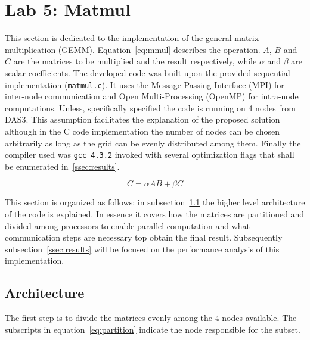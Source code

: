 \section{Lab 5: Matmul}

This section is dedicated to the implementation of the general matrix multiplication (GEMM). Equation~\ref{eq:mmul} describes the operation.
$A$, $B$ and $C$ are the matrices to be multiplied and the result respectively, while $\alpha$ and $\beta$ are scalar coefficients. 
The developed code was built upon the provided sequential implementation (\texttt{matmul.c}).
It uses the Message Passing Interface (MPI) for inter-node communication and Open Multi-Processing (OpenMP) for intra-node computations.
Unless, specifically specified the code is running on 4 nodes from DAS3. This assumption facilitates the explanation of the proposed solution although in the C code implementation the number of nodes can be chosen arbitrarily as long as the grid can be evenly distributed among them.
Finally the compiler used was \texttt{gcc 4.3.2} invoked with several optimization flags that shall be enumerated in~\ref{ssec:results}.

\begin{equation}
C = \alpha AB + \beta C
\label{eq:mmul}
\end{equation}

This section is organized as follows: in subsection~\ref{ssec:arch} the higher level architecture of the code is explained.
In essence it covers how the matrices are partitioned and divided among processors to enable parallel computation and what communication steps are necessary top obtain the final result.
Subsequently subsection~\ref{ssec:results} will be focused on the performance analysis of this implementation.

\subsection{Architecture}
\label{ssec:arch}

The first step is to divide the matrices evenly among the 4 nodes available.
The subscripts in equation~\ref{eq:partition} indicate the node responsible for the subset. 

